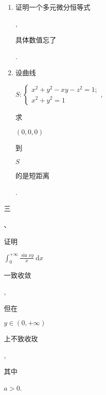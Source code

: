 \documentclass[10pt]{article}
\begin{document}
\begin{enumerate}
  \item \begin{CJK}{UTF8}{mj}证明一个多元微分恒等式\end{CJK}, \begin{CJK}{UTF8}{mj}具体数值忘了\end{CJK}.

  \item \begin{CJK}{UTF8}{mj}设曲线\end{CJK} $S:\left\{\begin{array}{l}x^{2}+y^{2}-x y-z^{2}=1 ; \\ x^{2}+y^{2}=1\end{array}\right.$, \begin{CJK}{UTF8}{mj}求\end{CJK} $(0,0,0)$ \begin{CJK}{UTF8}{mj}到\end{CJK} $S$ \begin{CJK}{UTF8}{mj}的是短距离\end{CJK}.

\end{enumerate}
\begin{CJK}{UTF8}{mj}三\end{CJK}、\begin{CJK}{UTF8}{mj}证明\end{CJK} $\int_{0}^{+\infty} \frac{\sin x y}{x} \mathrm{~d} x$ \begin{CJK}{UTF8}{mj}一致收敛\end{CJK}, \begin{CJK}{UTF8}{mj}但在\end{CJK} $y \in(0,+\infty)$ \begin{CJK}{UTF8}{mj}上不致收玫\end{CJK}, \begin{CJK}{UTF8}{mj}其中\end{CJK} $a>0$.
\end{document}
